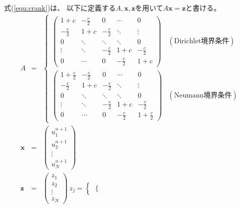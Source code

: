 \documentclass[a4j, titlepage]{jsarticle}
\numberwithin{equation}{section}
\begin{document}
        式(\ref{equ:crank})は、
        以下に定義する$A, \bm{x}, \bm{z}$を用いて$A\bm{x}=\bm{z}$と書ける。
        \begin{eqnarray*}
            A &=& \begin{cases}
                \begin{pmatrix}
                    1 + c & -\frac{c}{2} & 0 & \cdots & 0 \\
                    -\frac{c}{2} & 1 + c & -\frac{c}{2} & \ddots & \vdots \\
                    0 & \ddots & \ddots & \ddots & 0 \\
                    \vdots & \ddots & -\frac{c}{2} & 1 + c & -\frac{c}{2} \\
                    0 & \cdots & 0 & -\frac{c}{2} & 1 + c
                \end{pmatrix} & (\mathrm{Dirichlet}境界条件) \\
                \begin{pmatrix}
                    1 + \frac{c}{2} & -\frac{c}{2} & 0 & \cdots & 0 \\
                    -\frac{c}{2} & 1 + c & -\frac{c}{2} & \ddots & \vdots \\
                    0 & \ddots & \ddots & \ddots & 0 \\
                    \vdots & \ddots & -\frac{c}{2} & 1 + c & -\frac{c}{2} \\
                    0 & \cdots & 0 & -\frac{c}{2} & 1 + \frac{c}{2}
                \end{pmatrix} & (\mathrm{Neumann}境界条件)
            \end{cases} \\
            \bm{x} &=& \begin{pmatrix}
                u_1^{n + 1} \\
                u_2^{n + 1} \\
                \vdots \\
                u_N^{n + 1}
            \end{pmatrix} \\
            \bm{z} &=& \begin{pmatrix}
                z_1 \\
                z_2 \\
                \vdots \\
                z_N
            \end{pmatrix} \ z_j = \begin{cases}
                \begin{cases}

\end{cases}
\end{cases}
\end{eqnarray*}
\end{document}
